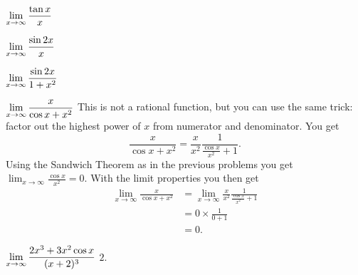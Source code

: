 \begin{multicols}{3}
\problem \carefulnow $\displaystyle\lim_{x\to\infty} \frac{\tan x}{x}$ 

\problem $\displaystyle\lim_{x\to\infty} \frac{\sin 2x}{x}$ 

\problem $\displaystyle \lim_{x\to\infty} \frac{\sin 2x}{1+x^2}$ 

\problem $\displaystyle \lim_{x\to\infty} \frac{x}{\cos x + x^2}$ 
\answer 
This is not a rational function, but you can use the same trick:  factor out the
highest power of $x$ from numerator and denominator.  You get
\[
 \frac{x}{\cos x + x^2}
 = \frac{x}{x^2} \frac{1}{\frac{\cos x}{x^2} + 1}.
\]
Using the Sandwich Theorem as in the previous problems you get
$\lim_{x\to\infty} \frac{\cos x}{x^2} = 0$.  With the limit properties you then
get
\begin{align*}
  \lim_{x\to\infty}\frac{x}{\cos x + x^2}
 &= \lim_{x\to\infty}\frac{x}{x^2} \frac{1}{\frac{\cos x}{x^2} + 1}\\
 &= 0\times \frac{1}{0+1} \\
 &= 0.
\end{align*}

\endanswer
\problem $\displaystyle \lim_{x\to\infty} \frac{2x^3+3x^2\cos x }{ (x+2)^3}$ 
\answer 
$2$.
\endanswer

\end{multicols}

